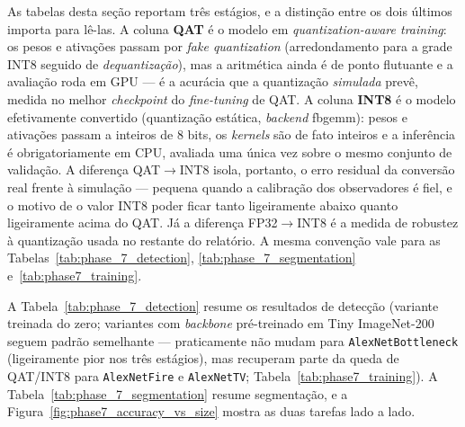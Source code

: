 \documentclass[conference]{IEEEtran}
\begin{document}
As tabelas desta seção reportam três estágios, e a distinção entre os dois últimos importa para
lê-las. A coluna \textbf{QAT} é o modelo em \textit{quantization-aware training}: os pesos e
ativações passam por \textit{fake quantization} (arredondamento para a grade INT8 seguido de
\textit{dequantização}), mas a aritmética ainda é de ponto flutuante e a avaliação roda em GPU — é
a acurácia que a quantização \emph{simulada} prevê, medida no melhor \textit{checkpoint} do
\textit{fine-tuning} de QAT. A coluna \textbf{INT8} é o modelo efetivamente convertido
(quantização estática, \textit{backend} fbgemm): pesos e ativações passam a inteiros de 8 bits, os
\textit{kernels} são de fato inteiros e a inferência é obrigatoriamente em CPU, avaliada uma única
vez sobre o mesmo conjunto de validação. A diferença QAT$\to$INT8 isola, portanto, o erro residual
da conversão real frente à simulação — pequena quando a calibração dos observadores é fiel, e o
motivo de o valor INT8 poder ficar tanto ligeiramente abaixo quanto ligeiramente acima do QAT. Já a
diferença FP32$\to$INT8 é a medida de robustez à quantização usada no restante do relatório. A
mesma convenção vale para as Tabelas~\ref{tab:phase_7_detection}, \ref{tab:phase_7_segmentation}
e~\ref{tab:phase7_training}.

A Tabela~\ref{tab:phase_7_detection} resume os resultados de detecção (variante treinada do zero;
variantes com \textit{backbone} pré-treinado em Tiny ImageNet-200 seguem padrão semelhante —
praticamente não mudam para \texttt{AlexNetBottleneck} (ligeiramente pior nos três estágios), mas
recuperam parte da queda de QAT/INT8 para \texttt{AlexNetFire} e \texttt{AlexNetTV};
Tabela~\ref{tab:phase7_training}). A Tabela~\ref{tab:phase_7_segmentation} resume
segmentação, e a Figura~\ref{fig:phase7_accuracy_vs_size} mostra as duas tarefas lado a lado.
\end{document}

